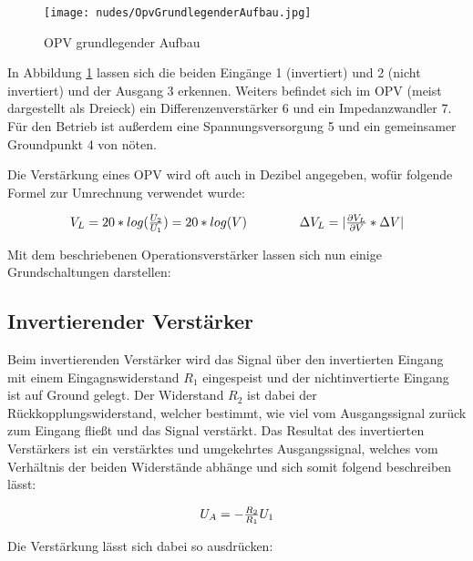 \documentclass[12pt,a4paper,twoside]{article}
\begin{document}
\begin{figure}[H]
    \centering
    \texttt{[image: nudes/OpvGrundlegenderAufbau.jpg]}
    \caption{OPV grundlegender Aufbau \cite{teachcenter2}}
    \label{fig:OpvAufbau}
\end{figure}

\noindent
In Abbildung \ref{fig:OpvAufbau} lassen sich die beiden Eingänge 1 (invertiert) und 2 (nicht invertiert) und der Ausgang 3 erkennen. Weiters befindet sich im OPV (meist dargestellt als Dreieck) ein Differenzenverstärker 6 und ein Impedanzwandler 7. Für den Betrieb ist außerdem eine Spannungsversorgung 5 und ein gemeinsamer Groundpunkt 4 von nöten. \newline

\noindent
Die Verstärkung eines OPV wird oft auch in Dezibel angegeben, wofür folgende Formel zur Umrechnung verwendet wurde:

\begin{equation}
    \label{eq:VerstärkungDezibel}
    \centerline{$V_{L} = 20*log(\frac{U_{2}}{U_{1}}) = 20*log(V)$ \\ $\Delta V_{L} = \vert \frac{\partial V_{L}}{\partial V} * \Delta V \vert$}
\end{equation}

\noindent
Mit dem beschriebenen Operationsverstärker lassen sich nun einige Grundschaltungen darstellen:

\subsection{Invertierender Verstärker}

Beim invertierenden Verstärker wird das Signal über den invertierten Eingang mit einem Eingagnswiderstand $R_{1}$ eingespeist und der nichtinvertierte Eingang ist auf Ground gelegt. Der Widerstand $R_{2}$ ist dabei der Rückkopplungswiderstand, welcher bestimmt, wie viel vom Ausgangssignal zurück zum Eingang fließt und das Signal verstärkt.
Das Resultat des invertierten Verstärkers ist ein verstärktes und umgekehrtes Ausgangssignal, welches vom Verhältnis der beiden Widerstände abhänge und sich somit folgend beschreiben lässt:

\begin{equation}
    \label{eq:InvertierenderVerstärkerAusgang}
    \centerline{$U_{A}=-\frac{R_{2}}{R_{1}}U_{1}$}
\end{equation}

\noindent
Die Verstärkung lässt sich dabei so ausdrücken:
\end{document}
